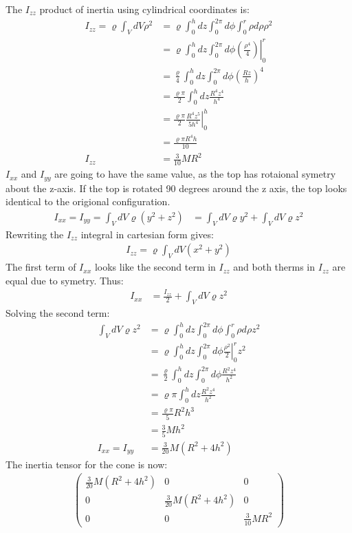 \documentclass[a4paper,12pt]{article}
\begin{document}
The $I_{zz}$ product of inertia using cylindrical coordinates is:
\begin{align*}
I_{zz}=\varrho\int_{V}dV\rho^2&=\varrho\int_0^hdz\int_0^{2\pi}d\phi\int_0^r\rho d\rho\rho^2\\
&=\left.\varrho\int_0^hdz\int_0^{2\pi}d\phi\left(\frac{\rho^4}{4}\right)\right|_0^r\\
&=\frac{\varrho}{4}\int_0^hdz\int_0^{2\pi}d\phi\left(\frac{Rz}{h}\right)^4\\
&=\frac{\varrho\pi}{2}\int_0^hdz\frac{R^4z^4}{h^4}\\
&=\frac{\varrho\pi}{2}\left.\frac{R^4z^5}{5h^4}\right|_0^h\\
&=\frac{\varrho\pi R^4h}{10}\\
I_{zz}&=\frac{3}{10}MR^2
\end{align*}
$I_{xx}$ and $I_{yy}$ are going to have the same value, as the top has rotaional symetry about the z-axis.  If the top is rotated 90 degrees around the z axis, the top looks identical to the origional configuration.
\begin{align*}
I_{xx}=I_{yy}=\int_VdV\varrho(y^2+z^2)&=\int_VdV\varrho y^2+\int_VdV\varrho z^2
\end{align*}
Rewriting the $I_{zz}$ integral in cartesian form gives:
\begin{align*}
I_{zz}=\varrho\int_VdV(x^2+y^2)
\end{align*}
The first term of $I_{xx}$ looks like the second term in $I_{zz}$ and both therms in $I_{zz}$ are equal due to symetry.  Thus:
\begin{align*}
I_{xx}&=\frac{I_{zz}}{2}+\int_VdV\varrho z^2
\end{align*}
Solving the second term:
\begin{align*}
\int_VdV\varrho z^2&=\varrho\int_0^hdz\int_0^{2\pi}d\phi\int_0^r\rho d\rho z^2\\
&=\varrho\int_0^hdz\int_0^{2\pi}d\phi\left.\frac{\rho^2}{2}\right|_0^rz^2\\
&=\frac{\varrho}{2}\int_0^hdz\int_0^{2\pi}d\phi\frac{R^2z^4}{h^2}\\
&=\varrho\pi\int_0^hdz\frac{R^2z^4}{h^2}\\
&=\frac{\varrho\pi}{5}R^2h^3\\
&=\frac{3}{5}Mh^2\\
I_{xx}=I_{yy}&=\frac{3}{20}M(R^2+4h^2)
\end{align*}
The inertia tensor for the cone is now:
\begin{align*}
\left( \begin{array}{ccc}
\frac{3}{20}M(R^2+4h^2) & 0 & 0\\
0 & \frac{3}{20}M(R^2+4h^2) & 0\\
0 & 0 & \frac{3}{10}MR^2 \end{array} \right)
\end{align*}
\end{document}
